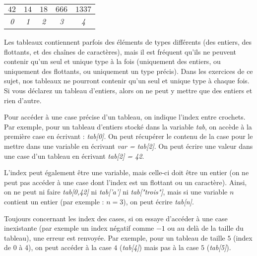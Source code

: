 \documentclass[11pt,a4paper]{article}
\begin{document}
\bigskip

\begin{table}[h!]
  \centering
  \begin{tabular}{| c | c | c | c | c |}
  \hline
$ 42 $ & $ 14 $ & $ 18 $ & $ 666 $ & $ 1337 $ \\
  \hline
\textit{0} & \textit{1} & \textit{2} & \textit{3} & \textit{4} \\
  \hline
  \end{tabular}
\end{table}

\bigskip

Les tableaux contiennent parfois des éléments de types différents (des entiers, des flottants, et des chaînes de caractères), mais il est fréquent qu'ils ne peuvent contenir qu'un seul et unique type à la fois (uniquement des entiers, ou uniquement des flottants, ou uniquement un type précis).
Dans les exercices de ce sujet, nos tableaux ne pourront contenir qu'un seul et unique type à chaque fois.
Si vous déclarez un tableau d'entiers, alors on ne peut y mettre que des entiers et rien d'autre.

\bigskip

Pour accéder à une case précise d'un tableau, on indique l'index entre crochets.
Par exemple, pour un tableau d'entiers stocké dans la variable \textit{tab}, on accède à la première case en écrivant : \textit{tab[0]}.
On peut récupérer le contenu de la case pour le mettre dans une variable en écrivant \textit{var = tab[2]}.
On peut écrire une valeur dans une case d'un tableau en écrivant \textit{tab[2] = 42}.

\bigskip

L'index peut également être une variable, mais celle-ci doit être un entier (on ne peut pas accéder à une case dont l'index est un flottant ou un caractère).
Ainsi, on ne peut ni faire \textit{tab[0,42]} ni \textit{tab['a']} ni \textit{tab["trois"]}, mais si une variable $ n $ contient un entier (par exemple : $ n = 3 $), on peut écrire \textit{tab[n]}.

\bigskip

Toujours concernant les index des cases, si on essaye d'accéder à une case inexistante (par exemple un index négatif comme $ -1 $ ou au delà de la taille du tableau), une erreur est renvoyée.
Par exemple, pour un tableau de taille $ 5 $ (index de 0 à 4), on peut accéder à la case $ 4 $ (\textit{tab[4]}) mais pas à la case $ 5 $ (\textit{tab[5]}).
\end{document}
